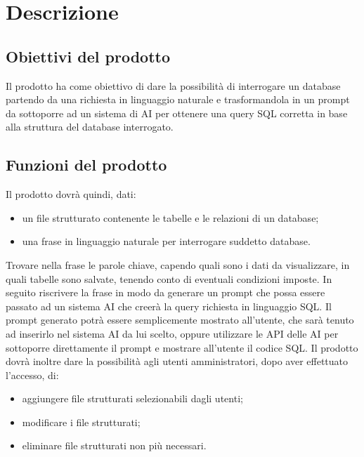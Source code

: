 \section{Descrizione}
\subsection{Obiettivi del prodotto}
Il prodotto ha come obiettivo di dare la possibilità di interrogare un database partendo da una richiesta in linguaggio naturale e trasformandola in un prompt da sottoporre ad un sistema di AI per ottenere una query SQL corretta in base alla struttura del database interrogato.

\subsection{Funzioni del prodotto}
Il prodotto dovrà quindi, dati:
\begin{itemize}
	\item un file strutturato contenente le tabelle e le relazioni di un database;
	\item una frase in linguaggio naturale per interrogare suddetto database.
\end{itemize}
Trovare nella frase le parole chiave, capendo quali sono i dati da visualizzare, in quali tabelle sono salvate, tenendo conto di eventuali condizioni imposte.
In seguito riscrivere la frase in modo da generare un prompt che possa essere passato ad un sistema AI che creerà la query richiesta in linguaggio SQL.
Il prompt generato potrà essere semplicemente mostrato all’utente, che sarà tenuto ad inserirlo nel sistema AI da lui scelto, oppure utilizzare le API delle AI per sottoporre direttamente il prompt e mostrare all’utente il codice SQL.
Il prodotto dovrà inoltre dare la possibilità agli utenti amministratori, dopo aver effettuato l’accesso, di:
\begin{itemize}
	\item aggiungere file strutturati selezionabili dagli utenti;
	\item modificare i file strutturati;
	\item eliminare file strutturati non più necessari.
\end{itemize}